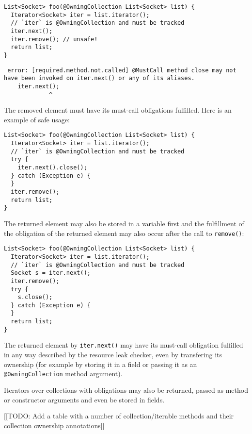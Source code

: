 \begin{verbatim}
List<Socket> foo(@OwningCollection List<Socket> list) {
  Iterator<Socket> iter = list.iterator();
  // `iter` is @OwningCollection and must be tracked
  iter.next();
  iter.remove(); // unsafe!
  return list;
}
\end{verbatim}

\begin{verbatim}
 error: [required.method.not.called] @MustCall method close may not have been invoked on iter.next() or any of its aliases.
    iter.next();
             ^
\end{verbatim}

The removed element must have its must-call obligations fulfilled. Here is an example of safe usage:

\begin{verbatim}
List<Socket> foo(@OwningCollection List<Socket> list) {
  Iterator<Socket> iter = list.iterator();
  // `iter` is @OwningCollection and must be tracked
  try {
    iter.next().close();
  } catch (Exception e) {
  }
  iter.remove();
  return list;
}
\end{verbatim}

The returned element may also be stored in a variable first and the fulfillment of the obligation of the returned element may also occur after the call to \texttt{remove()}:

\begin{verbatim}
List<Socket> foo(@OwningCollection List<Socket> list) {
  Iterator<Socket> iter = list.iterator();
  // `iter` is @OwningCollection and must be tracked
  Socket s = iter.next();
  iter.remove();
  try {
    s.close();
  } catch (Exception e) {
  }
  return list;
}
\end{verbatim}

The returned element by \texttt{iter.next()} may have its must-call obligation fulfilled in any way described by the resource leak checker, even by transfering its ownership (for example by storing it in a field or passing it as an \texttt{@OwningCollection} method argument).

Iterators over collections with obligations may also be returned, passed as method or constructor arguments and even be stored in fields.

[[TODO: Add a table with a number of collection/iterable methods and their collection ownership annotations]]



